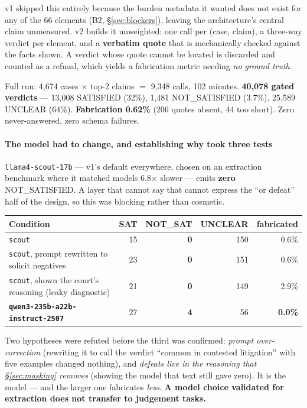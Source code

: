 \documentclass[12pt,a4paper]{article}
\newcommand{\code}[1]{\texttt{\small #1}}
\begin{document}
v1 skipped this entirely because the burden metadata it wanted does not exist for any of the 66
elements (B2, §\ref{sec:blockers}), leaving the architecture's central claim unmeasured. v2 builds it
unweighted: one call per (case, claim), a three-way verdict per element, and a \textbf{verbatim quote}
that is mechanically checked against the facts shown. A verdict whose quote cannot be located is
discarded and counted as a refusal, which yields a fabrication metric needing \emph{no ground truth}.

Full run: 4,674 cases $\times$ top-2 claims $=$ 9,348 calls, 102 minutes.
\textbf{40,078 gated verdicts} --- 13,008 SATISFIED (32\%), 1,481 NOT\_SATISFIED (3.7\%), 25,589
UNCLEAR (64\%). \textbf{Fabrication 0.62\%} (206 quotes absent, 44 too short). Zero never-answered,
zero schema failures.

\paragraph{The model had to change, and establishing why took three tests} \code{llama4-scout-17b} ---
v1's default everywhere, chosen on an extraction benchmark where it matched models 6.8$\times$ slower
--- emits \textbf{zero} NOT\_SATISFIED. A layer that cannot say that cannot express the
``or defeat'' half of the design, so this was blocking rather than cosmetic.

\begin{center}
\begin{tabular}{@{}lrrrr@{}}
\toprule
\textbf{Condition} & \textbf{SAT} & \textbf{NOT\_SAT} & \textbf{UNCLEAR} & \textbf{fabricated} \\
\midrule
\code{scout} & 15 & \textbf{0} & 150 & 0.6\% \\
\code{scout}, prompt rewritten to solicit negatives & 23 & \textbf{0} & 151 & 0.6\% \\
\code{scout}, shown the court's reasoning (leaky diagnostic) & 21 & \textbf{0} & 149 & 2.9\% \\
\textbf{\code{qwen3-235b-a22b-instruct-2507}} & 27 & \textbf{4} & 56 & \textbf{0.0\%} \\
\bottomrule
\end{tabular}
\end{center}

Two hypotheses were refuted before the third was confirmed: \emph{prompt over-correction} (rewriting
it to call the verdict ``common in contested litigation'' with five examples changed nothing), and
\emph{defeats live in the reasoning that §\ref{sec:masking} removes} (showing the model that text
still gave zero). It is the model --- and the larger one fabricates \emph{less}.
\textbf{A model choice validated for extraction does not transfer to judgement tasks.}
\end{document}
